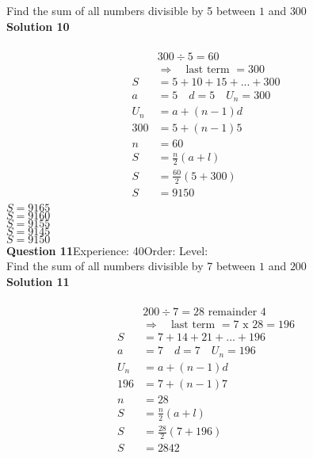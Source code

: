 \documentclass{article}
\begin{document}
Find the sum of all numbers divisible by 5 between $1$ and $300$\\[4pt]
\noindent\textbf{Solution 10}\\[2pt]
\\[-10pt]\begin{align*}
&300 \div 5 = 60\\[2pt]
&\Rightarrow \quad \text{last term }= 300\\[2pt]
S&=5+10+15+...+300\\[12pt]
a&=5\quad d=5 \quad U_n=300\\[2pt]
U_n&=a+(n-1)d\\[2pt]
300&=5+(n-1)5\\[2pt]
n&=60\\[12pt]
S&=\displaystyle\frac{n}{2}(a+l)\\[2pt]
S&=\displaystyle\frac{60}{2}(5+300)\\[2pt]
S&=9150\\[-50pt]
\end{align*}
$S=9165$\\
$S=9160$\\
$S=9155$\\
$S=9145$\\
$S=9150$\\
\noindent\textbf{Question 11}\hspace{20pt}Experience: 40\hspace{20pt}Order: \hspace{20pt}Level: \\[2pt]
Find the sum of all numbers divisible by 7 between $1$ and $200$\\[4pt]
\noindent\textbf{Solution 11}\\[2pt]
\\[-10pt]\begin{align*}
&200 \div 7 = 28 \,\, \text{remainder}\,\, 4\\[2pt]
&\Rightarrow \quad \text{last term }= 7 \,\,\text{x}\,\, 28=196\\[2pt]
S&=7+14+21+...+196\\[12pt]
a&=7\quad d=7 \quad U_n=196\\[2pt]
U_n&=a+(n-1)d\\[2pt]
196&=7+(n-1)7\\[2pt]
n&=28\\[12pt]
S&=\displaystyle\frac{n}{2}(a+l)\\[2pt]
S&=\displaystyle\frac{28}{2}(7+196)\\[2pt]
S&=2842\\[-140pt]
\end{align*}
\end{document}
